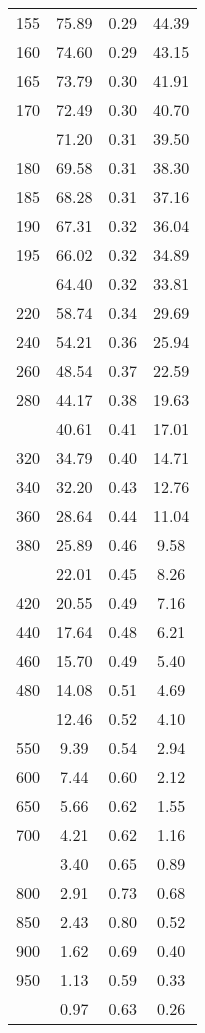 \begin{table}[ht]
\begin{tabular}{lccc}
  155 & 75.89 & 0.29 & 44.39 \\ 
  160 & 74.60 & 0.29 & 43.15 \\ 
  165 & 73.79 & 0.30 & 41.91 \\ 
  170 & 72.49 & 0.30 & 40.70 \\ 
   \addlinespace
175 & 71.20 & 0.31 & 39.50 \\ 
  180 & 69.58 & 0.31 & 38.30 \\ 
  185 & 68.28 & 0.31 & 37.16 \\ 
  190 & 67.31 & 0.32 & 36.04 \\ 
  195 & 66.02 & 0.32 & 34.89 \\ 
   \addlinespace
200 & 64.40 & 0.32 & 33.81 \\ 
  220 & 58.74 & 0.34 & 29.69 \\ 
  240 & 54.21 & 0.36 & 25.94 \\ 
  260 & 48.54 & 0.37 & 22.59 \\ 
  280 & 44.17 & 0.38 & 19.63 \\ 
   \addlinespace
300 & 40.61 & 0.41 & 17.01 \\ 
  320 & 34.79 & 0.40 & 14.71 \\ 
  340 & 32.20 & 0.43 & 12.76 \\ 
  360 & 28.64 & 0.44 & 11.04 \\ 
  380 & 25.89 & 0.46 & 9.58 \\ 
   \addlinespace
400 & 22.01 & 0.45 & 8.26 \\ 
  420 & 20.55 & 0.49 & 7.16 \\ 
  440 & 17.64 & 0.48 & 6.21 \\ 
  460 & 15.70 & 0.49 & 5.40 \\ 
  480 & 14.08 & 0.51 & 4.69 \\ 
   \addlinespace
500 & 12.46 & 0.52 & 4.10 \\ 
  550 & 9.39 & 0.54 & 2.94 \\ 
  600 & 7.44 & 0.60 & 2.12 \\ 
  650 & 5.66 & 0.62 & 1.55 \\ 
  700 & 4.21 & 0.62 & 1.16 \\ 
   \addlinespace
750 & 3.40 & 0.65 & 0.89 \\ 
  800 & 2.91 & 0.73 & 0.68 \\ 
  850 & 2.43 & 0.80 & 0.52 \\ 
  900 & 1.62 & 0.69 & 0.40 \\ 
  950 & 1.13 & 0.59 & 0.33 \\ 
   \addlinespace
1000 & 0.97 & 0.63 & 0.26 \\ 
   \bottomrule
\end{tabular}
\end{table}
